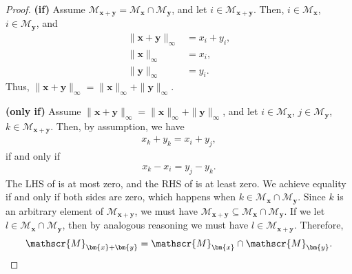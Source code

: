 \documentclass[letterpaper]{article} %
\newcommand{\bx}{{\bm{x}}}
\newcommand{\by}{{\bm{y}}}
\newcommand{\sM}{{\mathscr{M}}}
\newcommand{\argmax}{\mathrm{argmax}}
\begin{document}
\begin{proof}
    \textbf{(if)}
    Assume $\sM_{\bx+\by}=\sM_{\bx} \cap \sM_{\by}$, and let $i\in \sM_{\bx+\by}$. Then, $i\in \sM_{\bx}$, $i\in \sM_{\by}$, and
    \begin{align*}
        \|\bx+\by\|_\infty &= x_i+y_i,
        \\
        \|\bx\|_\infty &= x_i,
        \\
        \|\by\|_\infty &= y_i.
    \end{align*}
    Thus, $\|\bx+\by\|_\infty = \|\bx\|_\infty + \|\by\|_\infty$.

    \textbf{(only if)}
    Assume $\|\bx+\by\|_\infty = \|\bx\|_\infty + \|\by\|_\infty$, and let
    $i \in \mathscr{M}_{\bx}$, $j \in \mathscr{M}_{\by}$, $k \in \mathscr{M}_{\bx+\by}$.
     Then, by assumption, we have
     \begin{align*}
         x_k+y_k = x_i+y_j,
     \end{align*}
     if and only if
     \begin{align}
         x_k-x_i = y_j - y_k. \label{eq:compare_maxs}
     \end{align}
     The LHS of  is at most zero, and the RHS of  is at least zero. We achieve equality if and only if both sides are zero, which happens when
     $k\in\sM_{\bx}\cap \sM_{\by}$.
     Since $k$ is an arbitrary element of
     $\sM_{\bx+\by}$,
     we must have
     $\sM_{\bx+\by}\subseteq \sM_{\bx}\cap \sM_{\by}$.
     If we let
     $l\in \sM_{\bx}\cap \sM_{\by}$,
     then by analogous reasoning we must have
     $l\in\sM_{\bx+\by}$.
     Therefore,
     \[
        \sM_{\bx+\by}=\sM_{\bx}\cap\sM_{\by}. \qedhere
     \]
\end{proof}

\es*
\end{document}
